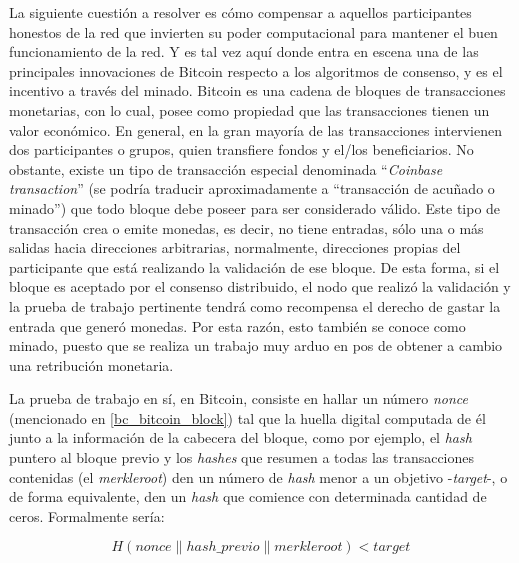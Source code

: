 La siguiente cuestión a resolver es cómo compensar a aquellos participantes honestos de la red que invierten su poder computacional para mantener el buen funcionamiento de la red. Y es tal vez aquí donde entra en escena una de las principales innovaciones de Bitcoin respecto a los algoritmos de consenso, y es el incentivo a través del minado. Bitcoin es una cadena de bloques de transacciones monetarias, con lo cual, posee como propiedad que las transacciones tienen un valor económico. En general, en la gran mayoría de las transacciones intervienen dos participantes o grupos, quien transfiere fondos y el/los beneficiarios. No obstante, existe un tipo de transacción especial denominada ``\textit{Coinbase transaction}'' (se podría traducir aproximadamente a ``transacción de acuñado o minado'') que todo bloque debe poseer para ser considerado válido. Este tipo de transacción crea o emite monedas, es decir, no tiene entradas, sólo una o más salidas hacia direcciones arbitrarias, normalmente, direcciones propias del participante que está realizando la validación de ese bloque. De esta forma, si el bloque es aceptado por el consenso distribuido, el nodo que realizó la validación y la prueba de trabajo pertinente tendrá como recompensa el derecho de gastar la entrada que generó monedas. Por esta razón, esto también se conoce como minado, puesto que se realiza un trabajo muy arduo en pos de obtener a cambio una retribución monetaria.

La prueba de trabajo en sí, en Bitcoin, consiste en hallar un número \textit{nonce} (mencionado en \ref{bc_bitcoin_block}) tal que la huella digital computada de él junto a la información de la cabecera del bloque, como por ejemplo, el \textit{hash} puntero al bloque previo y los \textit{hashes} que resumen a todas las transacciones contenidas (el \textit{merkleroot}) den un número de \textit{hash} menor a un objetivo -\textit{target}-, o de forma equivalente, den un \textit{hash} que comience con determinada cantidad de ceros. Formalmente sería:

\begin{equation}
H(nonce \| hash\_previo \| merkleroot) < target
\end{equation}

